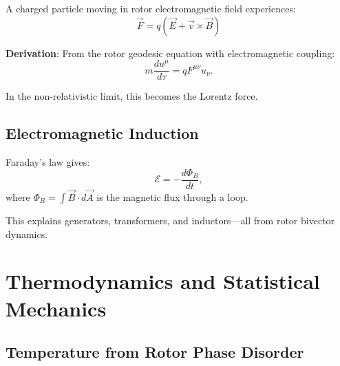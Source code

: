 \documentclass[12pt,a4paper]{article}
\theoremstyle{definition}
\theoremstyle{remark}
\begin{document}
A charged particle moving in rotor electromagnetic field experiences:
\begin{equation}
\boxed{\vec{F} = q(\vec{E} + \vec{v} \times \vec{B})}
\end{equation}

\textbf{Derivation}: From the rotor geodesic equation with electromagnetic coupling:
\begin{equation}
m \frac{du^\mu}{d\tau} = q F^{\mu\nu} u_\nu.
\end{equation}

In the non-relativistic limit, this becomes the Lorentz force.

\subsection{Electromagnetic Induction}

Faraday's law gives:
\begin{equation}
\mathcal{E} = -\frac{d\Phi_B}{dt},
\end{equation}
where $\Phi_B = \int \vec{B} \cdot d\vec{A}$ is the magnetic flux through a loop.

This explains generators, transformers, and inductors—all from rotor bivector dynamics.

\section{Thermodynamics and Statistical Mechanics}

\subsection{Temperature from Rotor Phase Disorder}
\end{document}
